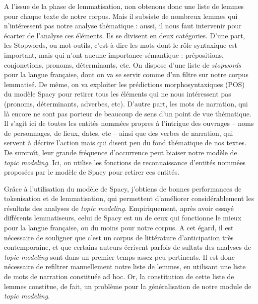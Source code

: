 \documentclass[letterpaper,portrait,12pt]{article}
\begin{document}
	A l'issue de la phase de lemmatisation, non obtenons donc une liste de lemmes pour chaque texte de notre corpus. Mais il subsiste de nombreux lemmes qui n'int\'{e}ressent pas notre analyse th\'{e}matique : aussi, il nous faut intervenir pour \'{e}carter de l'analyse ces \'{e}l\'{e}ments. Ils se divisent en deux cat\'{e}gories. D'une part, les Stopwords, ou mot-outils, c'est-\`{a}-dire les mots dont le r\^{o}le syntaxique est important, mais qui n'ont aucune importance s\'{e}mantique : pr\'{e}positions, conjonctions, pronoms, d\'{e}terminants, etc. On dispose d'une liste de \emph{stopwords} pour la langue fran\c{c}aise, dont on va se servir comme d'un filtre sur notre corpus lemmatis\'{e}. De m\^{e}me, on va exploiter les pr\'{e}dictions morphosyntaxiques (POS) du mod\`{e}le Spacy pour retirer tous les \'{e}l\'{e}ments qui ne nous int\'{e}ressent pas (pronoms, d\'{e}terminants, adverbes, etc). D'autre part, les mots de narration, qui l\`{a} encore ne sont pas porteur de beaucoup de sens d'un point de vue th\'{e}matique. Il s'agit ici de toutes les entit\'{e}s nomm\'{e}es propres \`{a} l'intrigue des ouvrages -- noms de personnages, de lieux, dates, etc -- ainsi que des verbes de narration, qui servent \`{a} d\'{e}crire l'action mais qui disent peu du fond th\'{e}matique de nos textes. De surcro\^{i}t, leur grande fr\'{e}quence d'occurrence peut biaiser notre mod\`{e}le de \emph{topic modeling}. Ici, on utilise les fonctions de reconnaissance d'entit\'{e}s nomm\'{e}es propos\'{e}es par le mod\`{e}le de Spacy pour retirer ces entit\'{e}s.





\textbf{	}Gr\^{a}ce \`{a} l'utilisation du mod\`{e}le de Spacy, j'obtiens de bonnes performances de tokenisation et de lemmatisation, qui permettent d'am\'{e}liorer consid\'{e}rablement les r\'{e}sultats des analyses de \emph{topic modeling}. Empiriquement, apr\`{e}s avoir essay\'{e} diff\'{e}rents lemmatiseurs, celui de Spacy est un de ceux qui fonctionne le mieux pour la langue fran\c{c}aise, ou du moins pour notre corpus. A cet \'{e}gard, il est n\'{e}cessaire de souligner que c'est un corpus de litt\'{e}rature d'anticipation tr\`{e}s contemporaine, et que certains auteurs \'{e}crivent parfois de  sultats des analyses de \emph{topic modeling} sont dans un premier temps assez peu pertinents. Il est donc n\'{e}cessaire de refiltrer manuellement notre liste de lemmes, en utilisant une liste de mots de narration constitu\'{e}e ad hoc. Or, la constitution de cette liste de lemmes constitue, de fait, un probl\`{e}me pour la g\'{e}n\'{e}ralisation de notre module de \emph{topic modeling}. 
\end{document}
